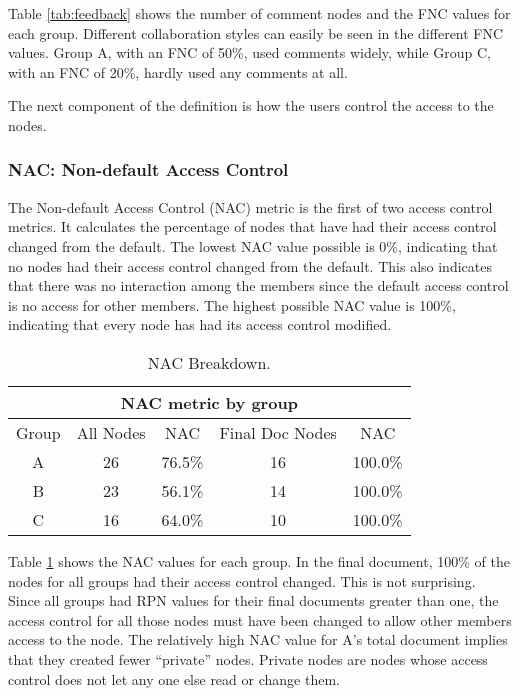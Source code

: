 Table \ref{tab:feedback} shows the number of comment nodes and the FNC
values for each group.  Different collaboration styles can easily be seen
in the different FNC values.  Group A, with an FNC of 50\%, used comments
widely, while Group C, with an FNC of 20\%, hardly used any comments
at all. 

The next component of the definition is how the users control the access to
the nodes.

\subsubsection{NAC: Non-default Access Control}

The Non-default Access Control (NAC) metric is the first of two access
control metrics.  It calculates the percentage of nodes that have had their
access control changed from the default.  The lowest NAC value possible is
0\%, indicating that no nodes had their access control changed from the
default.  This also indicates that there was no interaction among the
members since the default access control is no access for other members.
The highest possible NAC value is 100\%, indicating that every node has had
its access control modified.

\small
\begin{table}[htb]
  \caption{NAC Breakdown.}
  \begin{center}
    \begin{tabular}{|c|c|c|c|c|}
      \hline
      \multicolumn{5}{|c|}{\rule[-3mm]{0mm}{8mm}\bf NAC metric by group}\\ \hline
      Group&All Nodes&NAC&Final Doc Nodes&NAC\\ \hline
      \hline
      A&26&76.5\%&16&100.0\%\\ \hline
      B&23&56.1\%&14&100.0\%\\ \hline
      C&16&64.0\%&10&100.0\%\\ \hline
    \end{tabular}
  \end{center}
  \label{tab:access-control}
\end{table}
\normalsize

Table \ref{tab:access-control} shows the NAC values for each group.  In the
final document, 100\% of the nodes for all groups had their access control
changed.  This is not surprising.  Since all groups had RPN values for their
final documents greater than one, the access control for all those nodes
must have been changed to allow other members access to the node.  The
relatively high NAC value for A's total document implies that they
created fewer ``private'' nodes.  Private nodes are nodes whose access
control does not let any one else read or change them.

